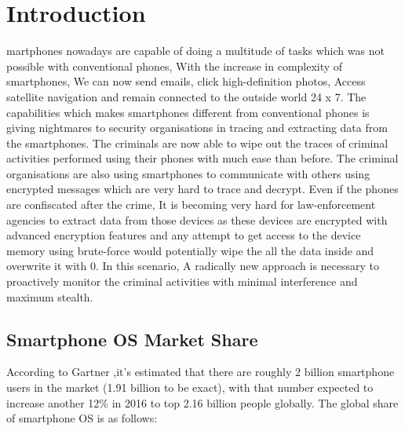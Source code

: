 %
%

\let\textcircled=\pgftextcircled
\chapter{Introduction}
\label{chap:intro}

martphones nowadays are capable of doing a multitude of tasks which was not possible with conventional phones, With the increase in complexity of smartphones, We can now send emails, click high-definition photos, Access satellite navigation and remain connected to the outside world 24 x 7.  The capabilities which makes smartphones different from conventional phones is giving nightmares to security organisations in tracing and extracting data from the smartphones.  The criminals are now  able to wipe out the traces of criminal activities performed using their phones with much ease than before.  The criminal organisations are also using smartphones to communicate with others using encrypted messages which are very hard to trace and decrypt.  Even if the phones are confiscated after the crime, It is becoming very hard for law-enforcement agencies to extract data from those devices as these devices are encrypted with advanced encryption features and any attempt to get access to the device memory using brute-force would potentially wipe the all the data inside and overwrite it with 0. In this scenario, A radically new approach is necessary to proactively monitor the criminal activities with minimal interference and maximum stealth.
\section{Smartphone OS Market Share}
\label{sec:sec01}
According to Gartner ,it's estimated that there are roughly 2 billion smartphone users in the market (1.91 billion to be exact), with that number expected to increase another 12\% in 2016 to top 2.16 billion people globally. The global share of smartphone OS is as follows:

